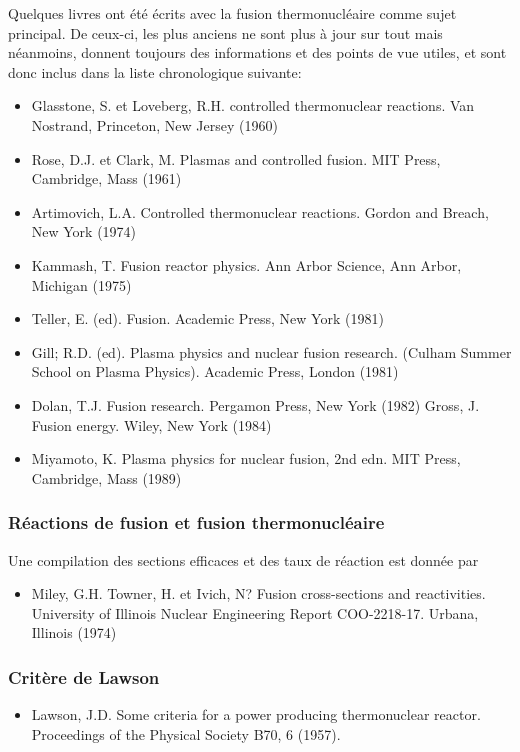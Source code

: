 \documentclass[main.tex]{subfiles}
\begin{document}
Quelques livres ont été écrits avec la fusion thermonucléaire comme sujet principal.
De ceux-ci, les plus anciens ne sont plus à jour sur tout mais néanmoins, donnent toujours des informations et des points de vue utiles, et sont donc inclus dans la liste chronologique suivante:

\begin{itemize}
	\item Glasstone, S. et Loveberg, R.H. controlled thermonuclear reactions. Van Nostrand, Princeton, New Jersey (1960)
	\item Rose, D.J. et Clark, M. Plasmas and controlled fusion. MIT Press, Cambridge, Mass (1961)
	\item Artimovich, L.A. Controlled thermonuclear reactions. Gordon and Breach, New York (1974)
	\item Kammash, T. Fusion reactor physics. Ann Arbor Science, Ann Arbor, Michigan (1975)
	\item Teller, E. (ed). Fusion. Academic Press, New York (1981)
	\item Gill; R.D. (ed). Plasma physics and nuclear fusion research. (Culham Summer School on Plasma Physics). Academic Press, London (1981)
	\item Dolan, T.J. Fusion research. Pergamon Press, New York (1982)
	Gross, J. Fusion energy. Wiley, New York (1984)
	\item Miyamoto, K. Plasma physics for nuclear fusion, 2nd edn. MIT Press, Cambridge, Mass (1989)	
\end{itemize}

\subsubsection*{Réactions de fusion et fusion thermonucléaire}

Une compilation des sections efficaces et des taux de réaction est donnée par

\begin{itemize}
	\item Miley, G.H. Towner, H. et Ivich, N? Fusion cross-sections and reactivities. University of Illinois Nuclear Engineering Report COO-2218-17. Urbana, Illinois (1974)
\end{itemize}

\subsubsection*{Critère de Lawson}

\begin{itemize}
	\item Lawson, J.D. Some criteria for a power producing thermonuclear reactor. Proceedings of the Physical Society B70, 6 (1957).
\end{itemize}
\end{document}
